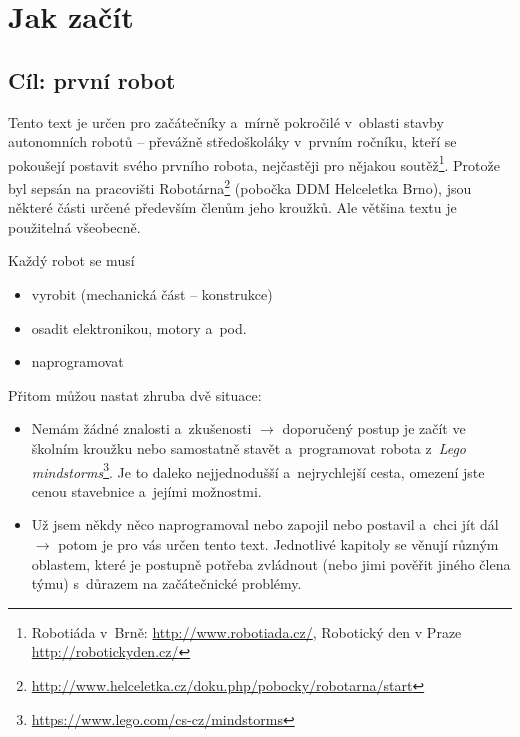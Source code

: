 \section{Jak začít}

\subsection{Cíl: první robot}


Tento text je určen pro začátečníky a~mírně pokročilé v~oblasti stavby autonomních robotů -- převážně středoškoláky v~prvním ročníku, kteří se pokoušejí postavit 
svého prvního 
robota, nejčastěji pro nějakou soutěž\footnote{Robotiáda v~Brně: \url{http://www.robotiada.cz/}, 
Robotický den v Praze \url{http://robotickyden.cz/} }. Protože byl sepsán na pracovišti Robotárna\footnote{\url{http://www.helceletka.cz/doku.php/pobocky/robotarna/start}} (pobočka DDM Helceletka Brno), jsou některé části určené především členům jeho kroužků. Ale většina textu je použitelná všeobecně.   

Každý robot se musí 
\begin{itemize} %
\item vyrobit (mechanická část -- konstrukce)
\item osadit elektronikou, motory a~pod. 
\item naprogramovat 
\end{itemize}

Přitom můžou nastat zhruba dvě situace: 

\begin{itemize} %
\item  Nemám žádné znalosti a~zkušenosti $\rightarrow$ doporučený postup je začít ve školním kroužku 
nebo samostatně stavět a~programovat robota z~{\it Lego mindstorms}\footnote{\url{https://www.lego.com/cs-cz/mindstorms}}. 
Je to daleko nejjednodušší a~nejrychlejší cesta, omezení jste cenou stavebnice a~jejími možnostmi. 

\item  Už jsem někdy něco naprogramoval nebo zapojil nebo postavil a~chci jít dál $\rightarrow$ potom je pro vás určen tento text. Jednotlivé kapitoly se věnují různým oblastem, které je postupně potřeba zvládnout (nebo jimi pověřit jiného člena týmu) s~důrazem na začátečnické problémy. 
\end{itemize}

